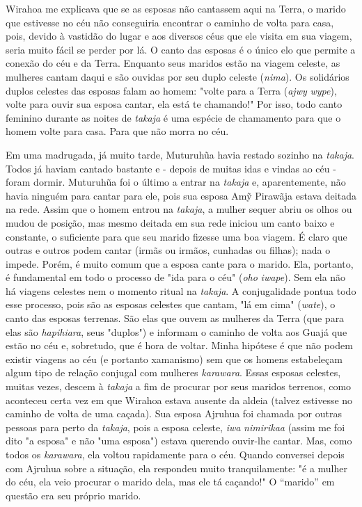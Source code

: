 Wirahoa me explicava que se as esposas não cantassem aqui na Terra, o
marido que estivesse no céu não conseguiria encontrar o caminho de volta
para casa, pois, devido à vastidão do lugar e aos diversos céus que ele
visita em sua viagem, seria muito fácil se perder por lá. O canto das
esposas é o único elo que permite a conexão do céu e da Terra. Enquanto
seus maridos estão na viagem celeste, as mulheres cantam daqui e são
ouvidas por seu duplo celeste (\emph{nima}). Os solidários duplos
celestes das esposas falam ao homem: "volte para a Terra (\emph{ajwy}
\emph{wype}), volte para ouvir sua esposa cantar, ela está te chamando!"
Por isso, todo canto feminino durante as noites de \emph{takaja} é uma
espécie de chamamento para que o homem volte para casa. Para que não
morra no céu.

Em uma madrugada, já muito tarde, Muturuhũa havia restado sozinho na
\emph{takaja}. Todos já haviam cantado bastante e - depois de muitas
idas e vindas ao céu - foram dormir. Muturuhũa foi o último a entrar na
\emph{takaja} e, aparentemente, não havia ninguém para cantar para ele,
pois sua esposa Amỹ Pirawãja estava deitada na rede. Assim que o homem
entrou na \emph{takaja}, a mulher sequer abriu os olhos ou mudou de
posição, mas mesmo deitada em sua rede iniciou um canto baixo e
constante, o suficiente para que seu marido fizesse uma boa viagem. É
claro que outras e outros podem cantar (irmãs ou irmãos, cunhadas ou
filhas); nada o impede. Porém, é muito comum que a esposa cante para o
marido. Ela, portanto, é fundamental em todo o processo de "ida para o
céu" (\emph{oho} \emph{iwape}). Sem ela não há viagens celestes nem o
momento ritual na \emph{takaja}. A conjugalidade pontua todo esse
processo, pois são as esposas celestes que cantam, "lá em cima"
(\emph{wate}), o canto das esposas terrenas. São elas que ouvem as
mulheres da Terra (que para elas são \emph{hapihiara}, seus "duplos") e
informam o caminho de volta aos Guajá que estão no céu e, sobretudo, que
é hora de voltar. Minha hipótese é que não podem existir viagens ao céu
(e portanto xamanismo) sem que os homens estabeleçam algum tipo de
relação conjugal com mulheres \emph{karawara}. Essas esposas celestes,
muitas vezes, descem à \emph{takaja} a fim de procurar por seus maridos
terrenos, como aconteceu certa vez em que Wirahoa estava ausente da
aldeia (talvez estivesse no caminho de volta de uma caçada). Sua esposa
Ajruhua foi chamada por outras pessoas para perto da \emph{takaja}, pois
a esposa celeste, \emph{iwa} \emph{nimirikaa} (assim me foi dito "a
esposa" e não "uma esposa") estava querendo ouvir-lhe cantar. Mas, como
todos os \emph{karawara}, ela voltou rapidamente para o céu. Quando
conversei depois com Ajruhua sobre a situação, ela respondeu muito
tranquilamente: "é a mulher do céu, ela veio procurar o marido dela, mas
ele tá caçando!" O ``marido'' em questão era seu próprio marido.

